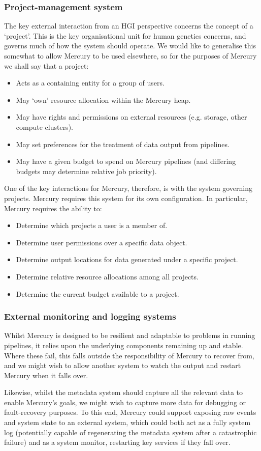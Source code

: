 \documentclass[10pt,a4paper]{article}
\newcommand{\npar}{\par\noindent\space}
\begin{document}
\subsubsection{Project-management system}
\label{sec:interactions:ldap}
\npar The key external interaction from an HGI perspective concerns the concept of a `project'. This is the key organisational unit for human genetics concerns, and governs much of how the system should operate. We would like to generalise this somewhat to allow Mercury to be used elsewhere, so for the purposes of Mercury we shall say that a project:
\begin{itemize}
\item Acts as a containing entity for a group of users.
\item May `own' resource allocation within the Mercury heap.
\item May have rights and permissions on external resources (e.g. storage, other compute clusters).
\item May set preferences for the treatment of data output from pipelines.
\item May have a given budget to spend on Mercury pipelines (and differing budgets may determine relative job priority).
\end{itemize}
\npar One of the key interactions for Mercury, therefore, is with the system governing projects. Mercury requires this system for its own configuration. In particular, Mercury requires the ability to:
\begin{itemize}
\item Determine which projects a user is a member of.
\item Determine user permissions over a specific data object.
\item Determine output locations for data generated under a specific project.
\item Determine relative resource allocations among all projects.
\item Determine the current budget available to a project.
\end{itemize}

\subsubsection{External monitoring and logging systems}
\npar Whilst Mercury is designed to be resilient and adaptable to problems in running pipelines, it relies upon the underlying components remaining up and stable. Where these fail, this falls outside the responsibility of Mercury to recover from, and we might wish to allow another system to watch the output and restart Mercury when it falls over.
\npar Likewise, whilst the metadata system should capture all the relevant data to enable Mercury's goals, we might wish to capture more data for debugging or fault-recovery purposes. To this end, Mercury could support exposing raw events and system state to an external system, which could both act as a fully system log (potentially capable of regenerating the metadata system after a catastrophic failure) and as a system monitor, restarting key services if they fall over.
\end{document}
